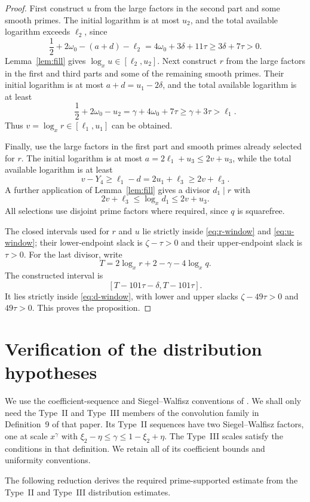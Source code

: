 \documentclass[11pt,reqno]{amsart}
\theoremstyle{definition}
\theoremstyle{remark}
\numberwithin{equation}{section}
\begin{document}
\begin{proof}
First construct $u$ from the large factors in the second part and some
smooth primes. The initial logarithm is at most $u_2$, and the total
available logarithm exceeds $\ell_2$, since
\[
 \frac12+2\omega_0-(a+d)-\ell_2
   =4\omega_0+3\delta+11\tau\ge3\delta+7\tau>0.
\]
Lemma~\ref{lem:fill} gives $\log_xu\in[\ell_2,u_2]$.
Next construct $r$ from the large factors in the first and third parts
and some of the remaining smooth primes. Their initial logarithm is
at most $a+d=u_1-2\delta$, and the total available logarithm is at least
\[
 \frac12+2\omega_0-u_2=\gamma+4\omega_0+7\tau
 \ge\gamma+3\tau>\ell_1.
\]
Thus $v=\log_xr\in[\ell_1,u_1]$ can be obtained.

Finally, use the large factors in the first part and smooth primes
already selected for $r$. The initial logarithm is at most
$a=2\ell_1+u_3\le2v+u_3$, while the total available logarithm is at least
\[
 v-Y_4\ge\ell_1-d=2u_1+\ell_3\ge2v+\ell_3.
\]
A further application of Lemma~\ref{lem:fill} gives a divisor $d_1\mid r$
with
\[
 2v+\ell_3\le\log_xd_1\le2v+u_3.
\]
All selections use disjoint prime factors where required, since $q$ is
squarefree.

The closed intervals used for $r$ and $u$ lie strictly inside
\eqref{eq:r-window} and \eqref{eq:u-window}; their lower-endpoint slack is
$\zeta-\tau>0$ and their upper-endpoint slack is $\tau>0$. For the last
divisor, write
\[
 T=2\log_xr+2-\gamma-4\log_xq.
\]
The constructed interval is
\[
 [T-101\tau-\delta,T-101\tau].
\]
It lies strictly inside \eqref{eq:d-window}, with lower and upper slacks
$\zeta-49\tau>0$ and $49\tau>0$. This proves the proposition.
\end{proof}

\section{Verification of the distribution hypotheses}\label{sec:distribution}
We use the coefficient-sequence and Siegel--Walfisz conventions of
\cite[Definitions~6--9]{Stadlmann26}.  We shall only need the Type~II
and Type~III members of the convolution family in Definition~9 of that
paper.  Its Type~II sequences have two Siegel--Walfisz factors, one at
scale $x^\gamma$ with
$\xi_2-\eta\le\gamma\le1-\xi_2+\eta$. The Type~III scales satisfy the
conditions in that definition. We retain all of its coefficient bounds
and uniformity conventions.

The following reduction derives the required prime-supported estimate from
the Type~II and Type~III distribution estimates.
\end{document}
